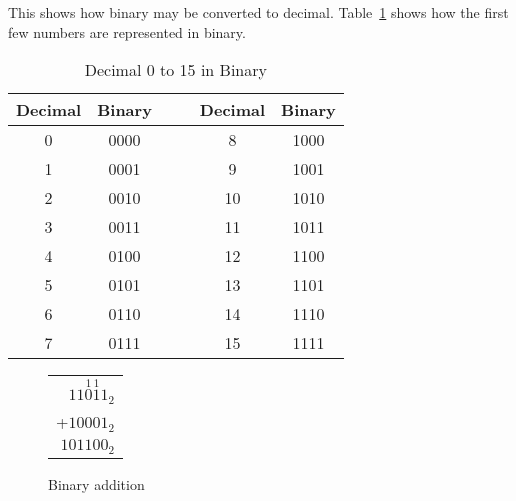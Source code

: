 This shows how binary may be converted to decimal. Table~\ref{tab:dec-bin}
shows how the first few numbers are represented in binary.
\begin{table}[t]
\begin{center}
\begin{tabular}{||c|c||cc||c|c||}
\hline
Decimal & Binary & & & Decimal & Binary \\
\hline
0       & 0000   & & & 8       & 1000 \\
\hline
1       & 0001   & & & 9       & 1001 \\
\hline
2       & 0010   & & & 10      & 1010 \\
\hline
3       & 0011   & & & 11      & 1011 \\
\hline
4       & 0100   & & & 12      & 1100 \\
\hline
5       & 0101   & & & 13      & 1101 \\
\hline
6       & 0110   & & & 14      & 1110 \\
\hline
7       & 0111   & & & 15      & 1111 \\
\hline
\end{tabular}
\caption{Decimal 0 to 15 in Binary\label{tab:dec-bin}}
\end{center}
\end{table}


\begin{figure}[h]
\begin{center}
\begin{tabular}{r}
 $11\overset{1}{0}\overset{1}{1}1_2$ \\
+$10001_2$ \\
\hline
$101100_2$ \\
\end{tabular}

\caption{Binary addition\label{fig:bin-add}}
\end{center}
\end{figure}

